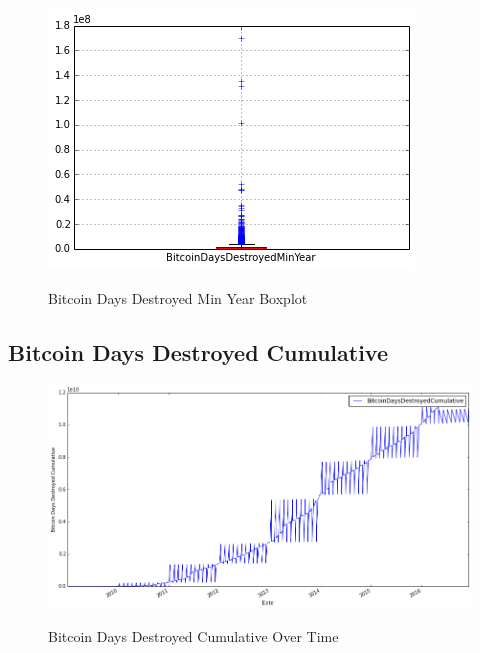 \begin{figure}[bth]
  \myfloatalign
  {\includegraphics[width=1\linewidth]
    {gfx/bitcoin-days-destroyed-min-year-boxplot}}
  \caption{Bitcoin Days Destroyed Min Year Boxplot}
  \label{fig:bitcoin-days-destroyed-min-year-boxplot}
\end{figure}

\clearpage

\subsection{Bitcoin Days Destroyed Cumulative}
\label{sec:bitcoin-days-destroyed-cumulative}

\begin{figure}[bth]
  \myfloatalign
  {\includegraphics[width=1\linewidth]
    {gfx/bitcoin-days-destroyed-cumulative-over-time}}
  \caption{Bitcoin Days Destroyed Cumulative Over Time}
  \label{fig:bitcoin-days-destroyed-cumulative-over-time}
\end{figure}

